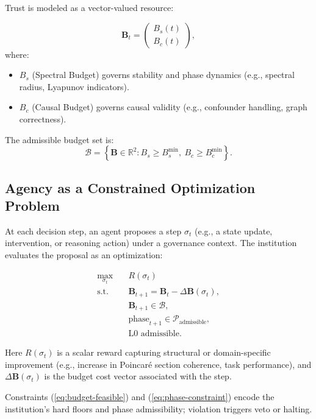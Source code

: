 \documentclass[11pt]{article}
\begin{document}
Trust is modeled as a vector-valued resource:

\begin{equation}
  \mathbf{B}_t = \begin{pmatrix} B_s(t) \\ B_c(t) \end{pmatrix},
\end{equation}
where:
\begin{itemize}[itemsep=2pt]
  \item \(B_s\) (Spectral Budget) governs stability and phase dynamics (e.g., spectral radius, Lyapunov indicators).
  \item \(B_c\) (Causal Budget) governs causal validity (e.g., confounder handling, graph correctness).
\end{itemize}

The admissible budget set is:
\begin{equation}
  \mathcal{B} = \left\{ \mathbf{B} \in \mathbb{R}^2 : B_s \ge B_s^{\min}, \ B_c \ge B_c^{\min} \right\}.
\end{equation}

\subsection{Agency as a Constrained Optimization Problem}

At each decision step, an agent proposes a step \(\sigma_t\) (e.g., a state update, intervention, or reasoning action) under a governance context. The institution evaluates the proposal as an optimization:

\begin{align}
  \max_{\sigma_t} \quad & R(\sigma_t) \\
  \text{s.t.} \quad & \mathbf{B}_{t+1} = \mathbf{B}_t - \Delta \mathbf{B}(\sigma_t), \label{eq:budget-update}\\
  & \mathbf{B}_{t+1} \in \mathcal{B}, \label{eq:budget-feasible}\\
  & \text{phase}_{t+1} \in \mathcal{P}_{\mathrm{admissible}}, \label{eq:phase-constraint}\\
  & \text{L0 admissible.} \nonumber
\end{align}

Here \(R(\sigma_t)\) is a scalar reward capturing structural or domain-specific improvement (e.g., increase in Poincar\'e section coherence, task performance), and \(\Delta \mathbf{B}(\sigma_t)\) is the budget cost vector associated with the step.

Constraints (\ref{eq:budget-feasible}) and (\ref{eq:phase-constraint}) encode the institution's hard floors and phase admissibility; violation triggers veto or halting.
\end{document}
